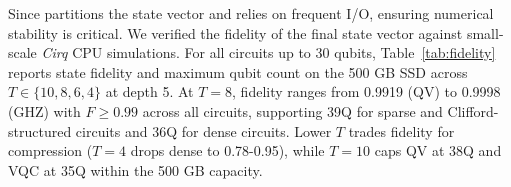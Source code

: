 Since \EdgeQuantum partitions the state vector and relies on frequent I/O, ensuring numerical stability is critical. We verified the fidelity of the final state vector against small-scale \textit{Cirq} CPU simulations. For all circuits up to 30 qubits, Table~\ref{tab:fidelity} reports state fidelity and maximum qubit count on the 500 GB SSD across $T \in \{10, 8, 6, 4\}$ at depth 5. At $T=8$, fidelity ranges from 0.9919 (QV) to 0.9998 (GHZ) with $F \geq 0.99$ across all circuits, supporting 39Q for sparse and Clifford-structured circuits and 36Q for dense circuits. Lower $T$ trades fidelity for compression ($T=4$ drops dense to 0.78-0.95), while $T=10$ caps QV at 38Q and VQC at 35Q within the 500 GB capacity.





